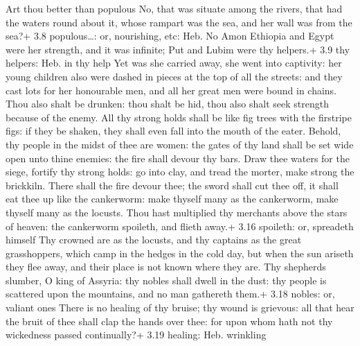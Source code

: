  Art thou better than populous No, that was situate among
the rivers, that had the waters round about it, whose rampart was the
sea, and her wall was from the sea?+ 3.8 populous\ldots: or, nourishing,
etc: Heb. No Amon  Ethiopia and Egypt were her strength,
and it was infinite; Put and Lubim were thy helpers.+ 3.9 thy helpers:
Heb. in thy help  Yet was she carried away, she went into
captivity: her young children also were dashed in pieces at the top of
all the streets: and they cast lots for her honourable men, and all her
great men were bound in chains.  Thou also shalt be
drunken: thou shalt be hid, thou also shalt seek strength because of the
enemy.  All thy strong holds shall be like fig trees with
the firstripe figs: if they be shaken, they shall even fall into the
mouth of the eater.  Behold, thy people in the midst of
thee are women: the gates of thy land shall be set wide open unto thine
enemies: the fire shall devour thy bars.  Draw thee
waters for the siege, fortify thy strong holds: go into clay, and tread
the morter, make strong the brickkiln.  There shall the
fire devour thee; the sword shall cut thee off, it shall eat thee up
like the cankerworm: make thyself many as the cankerworm, make thyself
many as the locusts.  Thou hast multiplied thy merchants
above the stars of heaven: the cankerworm spoileth, and flieth away.+
3.16 spoileth: or, spreadeth himself  Thy crowned are as
the locusts, and thy captains as the great grasshoppers, which camp in
the hedges in the cold day, but when the sun ariseth they flee away, and
their place is not known where they are.  Thy shepherds
slumber, O king of Assyria: thy nobles shall dwell in the dust: thy
people is scattered upon the mountains, and no man gathereth them.+ 3.18
nobles: or, valiant ones  There is no healing of thy
bruise; thy wound is grievous: all that hear the bruit of thee shall
clap the hands over thee: for upon whom hath not thy wickedness passed
continually?+ 3.19 healing: Heb. wrinkling
